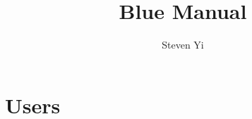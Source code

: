 \documentclass{book}
\begin{document}
\title{Blue Manual}
\author{Steven Yi}



\frontmatter




\tableofcontents
\listoffigures
\listoftables

\mainmatter

\part{Users}

\end{document}
